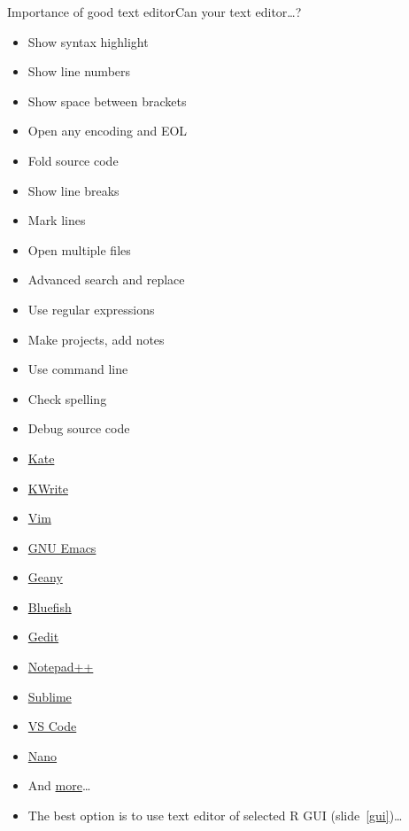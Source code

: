\documentclass[compress, xelatex, 11pt, xcolor=svgnames, aspectratio=169,
	hyperref={
		bookmarks=true,
		unicode=true,
		colorlinks=true,
		pdftitle={Molecular data in R},
		plainpages=false,
		pdfauthor={Vojtech Zeisek},
		pdfsubject={Course about phylogeny and evolution in R},
		pdfcreator={XeLaTeX},
		pdfkeywords={R, evolution, phylogeny, molecular data},
		linkcolor=Crimson, %
		anchorcolor=Magenta, %
		citecolor=Magenta, %
		filecolor=Magenta, %
		menucolor=Magenta, %
		urlcolor=DodgerBlue, %
		},
	url={hyphens, lowtilde} %
	]{beamer}
\begin{document}
\begin{frame}{Importance of good text editor}{Can your text editor\ldots ?}
	\label{editors}
	\begin{multicols}{2}
		\begin{itemize}
			\item Show syntax highlight
			\item Show line numbers
			\item Show space between brackets
			\item Open any encoding and EOL
			\item Fold source code
			\item Show line breaks
			\item Mark lines
			\item Open multiple files
			\item Advanced search and replace
			\item Use regular expressions
			\item Make projects, add notes
			\item Use command line
			\item Check spelling
			\item Debug source code
		\end{itemize}
	\end{multicols}
	\vfill
	\vfill
	\begin{multicols}{4}
		\begin{itemize}
			\item \href{https://kate-editor.org/}{Kate}
			\item \href{https://apps.kde.org/kwrite/}{KWrite}
			\item \href{https://www.vim.org/}{Vim}
			\item \href{https://en.wikipedia.org/wiki/Emacs}{GNU Emacs}
			\item \href{https://www.geany.org/}{Geany}
			\item \href{https://bluefish.openoffice.nl/}{Bluefish}
			\item \href{https://gedit-technology.github.io/apps/gedit/}{Gedit}
			\item \href{https://notepad-plus-plus.org/}{Notepad++}
			\item \href{https://www.sublimetext.com/}{Sublime}
			\item \href{https://code.visualstudio.com/}{VS Code}
			\item \href{https://www.nano-editor.org/}{Nano}
			\item And \href{https://en.wikipedia.org/wiki/List_of_text_editors}{more}\ldots
		\end{itemize}
	\end{multicols}
	\vfill
	\begin{itemize}
		\item The best option is to use text editor of selected R GUI (slide~\ref{gui})\ldots
	\end{itemize}
\end{frame}
\end{document}
